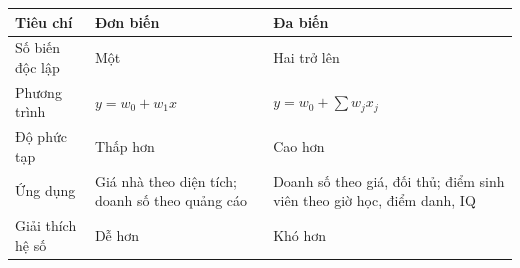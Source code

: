 \begin{phuongphap}[title={Bảng so sánh}]
\begin{center}
\small
\begin{tabular}{|l|p{3.8cm}|p{3.8cm}|}
\hline
\textbf{Tiêu chí} & \textbf{Đơn biến} & \textbf{Đa biến} \\
\hline
Số biến độc lập & Một & Hai trở lên \\
Phương trình & $y = w_0 + w_1 x$ & $y = w_0 + \sum w_j x_j$ \\
Độ phức tạp & Thấp hơn & Cao hơn \\
Ứng dụng & Giá nhà theo diện tích; doanh số theo quảng cáo & Doanh số theo giá, đối thủ; điểm sinh viên theo giờ học, điểm danh, IQ \\
Giải thích hệ số & Dễ hơn & Khó hơn \\
\hline
\end{tabular}
\end{center}
\end{phuongphap}
